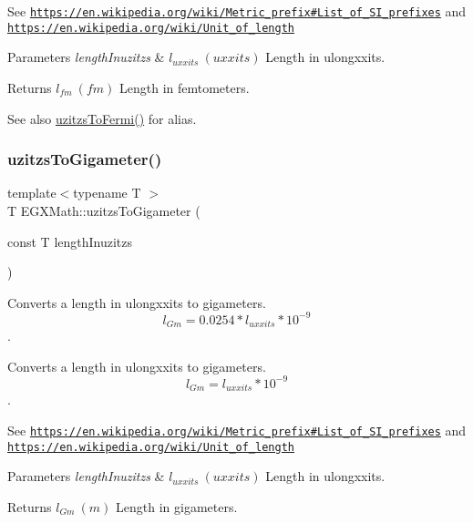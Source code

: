 See \href{https://en.wikipedia.org/wiki/Metric_prefix#List_of_SI_prefixes}{\tt https\+://en.\+wikipedia.\+org/wiki/\+Metric\+\_\+prefix\#\+List\+\_\+of\+\_\+\+S\+I\+\_\+prefixes} and \href{https://en.wikipedia.org/wiki/Unit_of_length}{\tt https\+://en.\+wikipedia.\+org/wiki/\+Unit\+\_\+of\+\_\+length} 
\begin{DoxyParams}{Parameters}
{\em length\+Inuzitzs} & $ l_{uxxits}\ (uxxits)$ Length in ulongxxits. \\
\hline
\end{DoxyParams}
\begin{DoxyReturn}{Returns}
$ l_{fm}\ (fm)$ Length in femtometers. 
\end{DoxyReturn}
\begin{DoxySeeAlso}{See also}
\mbox{\hyperlink{group___e_g_x_math-_conversions-_length_conversions-_imperial-uzitzs-_non-_s_i_ga920cd8aae6bc9f70faa49a6a5c988040}{uzitzs\+To\+Fermi()}} for alias. 
\end{DoxySeeAlso}
\mbox{\label{group___e_g_x_math-_conversions-_length_conversions-_imperial-uzitzs-_s_i_ga15833fbe62cb7d741b808bc63a21df55}} 
\subsubsection{\texorpdfstring{uzitzs\+To\+Gigameter()}{uzitzsToGigameter()}}
{\footnotesize\ttfamily template$<$typename T $>$ \\
T E\+G\+X\+Math\+::uzitzs\+To\+Gigameter (\begin{DoxyParamCaption}\item[{const T}]{length\+Inuzitzs }\end{DoxyParamCaption})}



Converts a length in ulongxxits to gigameters. \[ l_{Gm}=0.0254 * l_{uxxits} * 10^{-9} \]. 

Converts a length in ulongxxits to gigameters. \[ l_{Gm}=l_{uxxits} * 10^{-9} \].

See \href{https://en.wikipedia.org/wiki/Metric_prefix#List_of_SI_prefixes}{\tt https\+://en.\+wikipedia.\+org/wiki/\+Metric\+\_\+prefix\#\+List\+\_\+of\+\_\+\+S\+I\+\_\+prefixes} and \href{https://en.wikipedia.org/wiki/Unit_of_length}{\tt https\+://en.\+wikipedia.\+org/wiki/\+Unit\+\_\+of\+\_\+length} 
\begin{DoxyParams}{Parameters}
{\em length\+Inuzitzs} & $ l_{uxxits}\ (uxxits)$ Length in ulongxxits. \\
\hline
\end{DoxyParams}
\begin{DoxyReturn}{Returns}
$ l_{Gm}\ (m)$ Length in gigameters. 
\end{DoxyReturn}
\mbox{\label{group___e_g_x_math-_conversions-_length_conversions-_imperial-uzitzs-_s_i_gabc1973b8ea47e021bd981f94ac1f254d}} 
